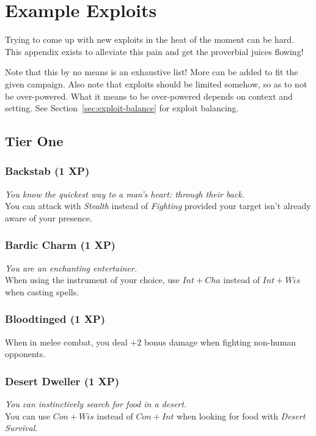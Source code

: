 \chapter{Example Exploits}\label{app:exploits}
Trying to come up with new exploits in the heat of the moment can be hard.
This appendix exists to alleviate this pain and get the proverbial juices flowing!

Note that this by no means is an exhaustive list!
More can be added to fit the given campaign.
Also note that exploits should be limited somehow, so as to not be over-powered. What it means to be over-powered depends on context and setting. See Section~\ref{sec:exploit-balance} for exploit balancing.

\section{Tier One}

\subsection{Backstab (1 XP)}
\textit{You know the quickest way to a man's heart: through their back.}\\
You can attack with \textit{Stealth} instead of \textit{Fighting} provided your target isn't already aware of your presence.

\subsection{Bardic Charm (1 XP)}
\textit{You are an enchanting entertainer.}\\
When using the instrument of your choice, use $Int+Cha$ instead of $Int+Wis$ when casting spells.

\subsection{Bloodtinged (1 XP)}
When in melee combat, you deal $+2$ bonus damage when fighting non-human opponents.

\subsection{Desert Dweller (1 XP)}
\textit{You can instinctively search for food in a desert.}\\
You can use $Con + Wis$ instead of $Con + Int$ when looking for food with \textit{Desert Survival}.

